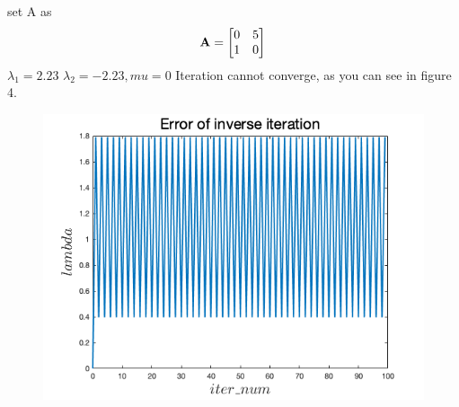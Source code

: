 \documentclass[english,onecolumn]{IEEEtran}
\newcommand{\bA}{{\bf A}}
\begin{document}
\begin{enumerate}
\begin{enumerate}
	set A as \[
	\bA = \begin{bmatrix}
		0 & 5 \\
		1 & 0
	\end{bmatrix}\,
	\]
	$\lambda_1 = 2.23$ $\lambda_2 = -2.23, mu = 0$  
	Iteration cannot converge, as you can see in figure 4.
	\begin{figure}
		\centering
		\includegraphics[width=0.5\linewidth]{code/inv_iter_not}
		\caption{}
		\label{fig:inviternot}
	\end{figure}
	
\end{enumerate}




\end{enumerate}


\newpage 
\end{document}
